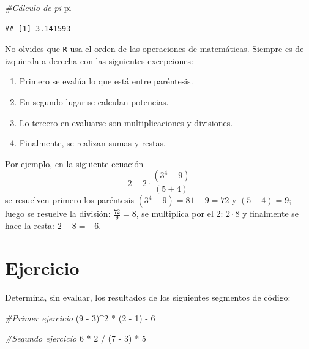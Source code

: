 \documentclass[]{tufte-book}
\newenvironment{Shaded}{}{}
\newcommand{\CommentTok}[1]{\textcolor[rgb]{0.38,0.63,0.69}{\textit{#1}}}
\newcommand{\DecValTok}[1]{\textcolor[rgb]{0.25,0.63,0.44}{#1}}
\newcommand{\NormalTok}[1]{#1}
\newcommand{\SpecialCharTok}[1]{\textcolor[rgb]{0.25,0.44,0.63}{#1}}
\begin{document}
\begin{Shaded}
\begin{Highlighting}[]
\CommentTok{\#Cálculo de pi}
\NormalTok{pi}
\end{Highlighting}
\end{Shaded}

\begin{verbatim}
## [1] 3.141593
\end{verbatim}

No olvides que \texttt{R} usa el orden de las operaciones de
matemáticas. Siempre es de izquierda a derecha con las siguientes
excepciones:

\begin{enumerate}
\def\labelenumi{\arabic{enumi}.}
\item
  Primero se evalúa lo que está entre paréntesis.
\item
  En segundo lugar se calculan potencias.
\item
  Lo tercero en evaluarse son multiplicaciones y divisiones.
\item
  Finalmente, se realizan sumas y restas.
\end{enumerate}

Por ejemplo, en la siguiente ecuación \[
2 - 2 \cdot \frac{(3^4 - 9)}{(5 + 4)}
\] se resuelven primero los paréntesis \((3^4 - 9) = 81 - 9 = 72\) y
\((5 + 4) = 9\); luego se resuelve la división: \(\frac{72}{9}=8\), se
multiplica por el \(2\): \(2 \cdot 8\) y finalmente se hace la resta:
\(2-8 = -6\).

\hypertarget{ejercicio}{%
\section{Ejercicio}\label{ejercicio}}

Determina, sin evaluar, los resultados de los siguientes segmentos de
código:

\begin{Shaded}
\begin{Highlighting}[]
\CommentTok{\#Primer ejercicio }
\NormalTok{(}\DecValTok{9} \SpecialCharTok{{-}} \DecValTok{3}\NormalTok{)}\SpecialCharTok{\^{}}\DecValTok{2} \SpecialCharTok{*}\NormalTok{ (}\DecValTok{2} \SpecialCharTok{{-}} \DecValTok{1}\NormalTok{) }\SpecialCharTok{{-}} \DecValTok{6}
\end{Highlighting}
\end{Shaded}

\begin{Shaded}
\begin{Highlighting}[]
\CommentTok{\#Segundo ejercicio }
\DecValTok{6} \SpecialCharTok{*} \DecValTok{2} \SpecialCharTok{/}\NormalTok{ (}\DecValTok{7} \SpecialCharTok{{-}} \DecValTok{3}\NormalTok{) }\SpecialCharTok{*} \DecValTok{5}
\end{Highlighting}
\end{Shaded}
\end{document}
